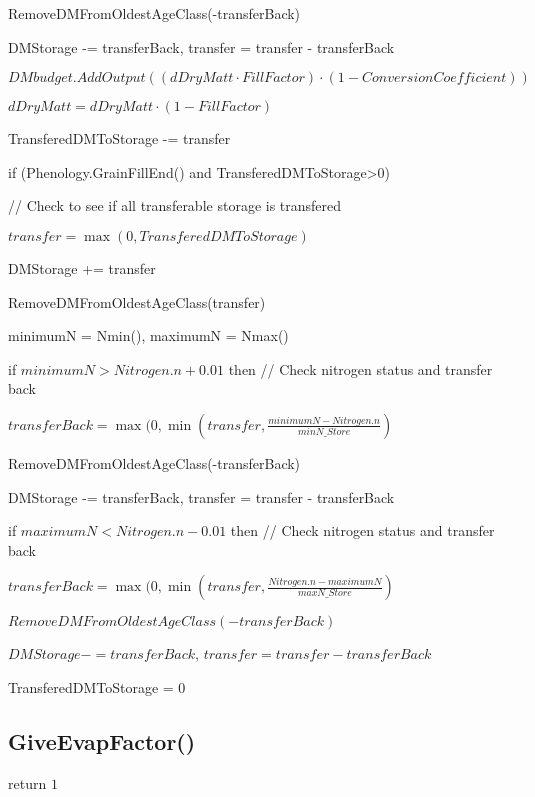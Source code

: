 \documentclass[%
]{scrartcl}
\begin{document}
   \quad \quad \quad     	RemoveDMFromOldestAgeClass(-transferBack)
 
    \quad \quad \quad     	DMStorage -= transferBack, transfer = transfer - transferBack

 	     	
      \quad \quad   $ DMbudget.AddOutput((dDryMatt \cdot FillFactor) \cdot (1-ConversionCoefficient))$
   
  \quad \quad     $dDryMatt =  dDryMatt \cdot (1-FillFactor)$
    
  \quad \quad    TransferedDMToStorage -= transfer



 if (Phenology.GrainFillEnd()  and  TransferedDMToStorage>0)     
       
 \quad //  Check to see if all transferable storage is transfered
  
\quad      $transfer=\max(0,TransferedDMToStorage)$

\quad   	DMStorage += transfer

\quad      RemoveDMFromOldestAgeClass(transfer)

 \quad     minimumN = Nmin(), 	maximumN = Nmax()

\quad      if $minimumN > Nitrogen.n + 0.01$  then     // Check nitrogen status and transfer back
     
\quad\quad        $ transferBack = \max(0,\min(transfer,\tfrac{minimumN - Nitrogen.n}{minN\_Store})$

\quad\quad      	RemoveDMFromOldestAgeClass(-transferBack)

 \quad\quad       	DMStorage -= transferBack,  transfer = transfer - transferBack
     
  \quad 	if $maximumN < Nitrogen.n - 0.01$ then   // Check nitrogen status and transfer back
   	
 \quad\quad       $ transferBack = \max(0,\min(transfer,\tfrac{Nitrogen.n - maximumN}{maxN\_Store})$

 \quad\quad      $	RemoveDMFromOldestAgeClass(-transferBack)$

  \quad\quad      $DMStorage -= transferBack$,
       $transfer = transfer - transferBack$
      
\quad      TransferedDMToStorage = 0






\subsection{GiveEvapFactor()}
   return $1$
\end{document}
